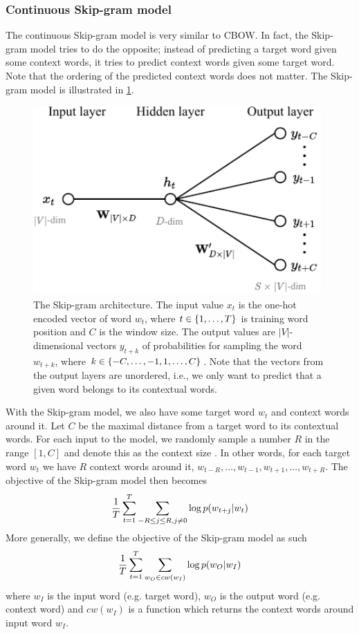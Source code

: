 \subsubsection{Continuous Skip-gram model}
The continuous Skip-gram model is very similar to CBOW. In fact, the Skip-gram model tries to do the opposite; instead of predicting a target word given some context words, it tries to predict context words given some target word. Note that the ordering of the predicted context words does not matter. The Skip-gram model is illustrated in \cref{fig:skip-gram-model}.

\begin{figure}[H]
    \centering
    \includegraphics[width=11cm]{thesis/figures/skim-gram_cropped.pdf}
    \caption{The Skip-gram architecture. The input value $x_t$ is the one-hot encoded vector of word $w_t$, where $t \in \left\{1, \ldots, T\right\}$ is training word position and $C$ is the window size. The output values are $|V|$-dimensional vectors $y_{t+k}$ of probabilities for sampling the word $w_{t+k}$, where $k \in \left\{-C, \ldots, -1, 1, \ldots, C\right\}$. Note that the vectors from the output layers are unordered, i.e., we only want to predict that a given word belongs to its contextual words.}
    \label{fig:skip-gram-model}
\end{figure}

With the Skip-gram model, we also have some target word $w_t$ and context words around it. Let $C$ be the maximal distance from a target word to its contextual words. For each input to the model, we randomly sample a number $R$ in the range $[1, C]$ and denote this as the context size \cite{mikolov2013a}. In other words, for each target word $w_t$ we have $R$ context words around it, $w_{t-R}, \ldots, w_{t-1}, w_{t+1}, \ldots, w_{t+R}$. The objective of the Skip-gram model \cite{mikolov2013b} then becomes
\begin{align}
    \frac{1}{T} \sum\limits_{t=1}^{T} \sum\limits_{-R \leq j \leq R, j \neq 0}^{} \log p(w_{t+j} | w_t)
    \label{eqn:skip-gram-objective-function}
\end{align}
More generally, we define the objective of the Skip-gram model as such
\begin{align}
    \frac{1}{T} \sum\limits_{t=1}^{T} \sum\limits_{w_O \in cw(w_I)}^{} \log p(w_O | w_I)
    \label{eqn:skip-gram-objective-function-general}
\end{align}
where $w_I$ is the input word (e.g. target word), $w_O$ is the output word (e.g. context word) and $cw(w_I)$ is a function which returns the context words around input word $w_I$.


